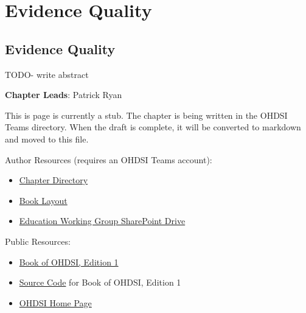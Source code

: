 \documentclass[
  letterpaper,
  paper=7in:10in,
  pagesize=pdftex,
  headinclude=on,
  footinclude=on,
  12pt]{scrbook}
\providecommand{\tightlist}{%
  \setlength{\itemsep}{0pt}\setlength{\parskip}{0pt}}\usepackage{longtable,booktabs,array}
\begin{document}
\part{Evidence Quality}

\chapter{Evidence Quality}\label{sec-quality-evidence}

TODO- write abstract

\hfill\break

\textbf{Chapter Leads}: Patrick Ryan

\begin{tcolorbox}[enhanced jigsaw, opacitybacktitle=0.6, coltitle=black, colback=white, bottomrule=.15mm, bottomtitle=1mm, title=\textcolor{quarto-callout-note-color}{\faInfo}\hspace{0.5em}{Note}, titlerule=0mm, rightrule=.15mm, colbacktitle=quarto-callout-note-color!10!white, colframe=quarto-callout-note-color-frame, toptitle=1mm, arc=.35mm, left=2mm, breakable, opacityback=0, leftrule=.75mm, toprule=.15mm]

This is page is currently a stub. The chapter is being written in the
OHDSI Teams directory. When the draft is complete, it will be converted
to markdown and moved to this file.

Author Resources (requires an OHDSI Teams account):

\begin{itemize}
\tightlist
\item
  \href{https://ohdsiorg.sharepoint.com/sites/Workgroup-EducationWorkingGroup/Shared\%20Documents/Forms/AllItems.aspx?id=\%2Fsites\%2FWorkgroup\%2DEducationWorkingGroup\%2FShared\%20Documents\%2FSection\%20IV\%20\%2D\%20Quality\%2FChapter\%2015\%20\%2D\%20Evidence\%20Quality&viewid=05fec2cc\%2Dec8a\%2D4d04\%2Db565\%2Dcf1289b96f67}{Chapter
  Directory}
\item
  \href{https://ohdsiorg.sharepoint.com/:x:/r/sites/Workgroup-EducationWorkingGroup/_layouts/15/Doc2.aspx?action=edit&sourcedoc=\%7B1fa31e39-1c5f-4918-b878-609ebd9810b3\%7D&wdOrigin=TEAMS-WEB.teamsSdk_ns.rwc&wdExp=TEAMS-TREATMENT&wdhostclicktime=1748104477731&web=1}{Book
  Layout}
\item
  \href{https://ohdsiorg.sharepoint.com/sites/Workgroup-EducationWorkingGroup/Shared\%20Documents/Forms/AllItems.aspx?viewid=05fec2cc\%2Dec8a\%2D4d04\%2Db565\%2Dcf1289b96f67}{Education
  Working Group SharePoint Drive}
\end{itemize}

Public Resources:

\begin{itemize}
\tightlist
\item
  \href{https://ohdsi.github.io/TheBookOfOhdsi/}{Book of OHDSI, Edition
  1}
\item
  \href{https://github.com/OHDSI/TheBookOfOhdsi}{Source Code} for Book
  of OHDSI, Edition 1
\item
  \href{https://ohdsi.org/}{OHDSI Home Page}
\end{itemize}

\end{tcolorbox}
\end{document}
